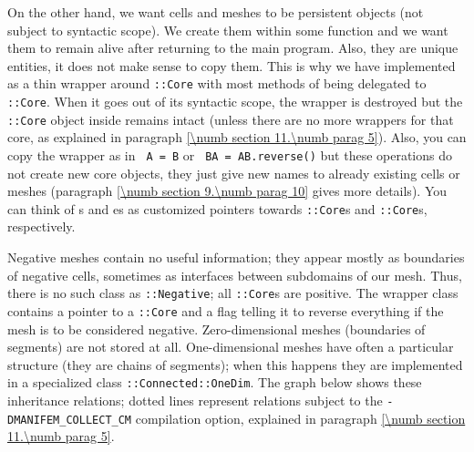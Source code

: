 On the other hand, we want cells and meshes to be persistent objects (not subject to
syntactic scope).
We create them within some function and we want them to remain alive after returning
to the main program.
Also, they are unique entities, it does not make sense to copy them.
This is why we have implemented {\small\tt {}} as a thin wrapper around
{\small\tt {}::Core}
with most methods of {\small\tt {}} being delegated to {\small\tt {}::Core}.
When it goes out of its syntactic scope, the wrapper is destroyed but the {\small\tt {}::Core}
object inside remains intact (unless there are no more wrappers for that core, as explained in
paragraph \ref{\numb section 11.\numb parag 5}).
Also, you can copy the wrapper as in {\small\tt {} A = B} or {\small\tt {} BA = AB.reverse()}
but these operations do not create new core objects, they just give new names to
already existing cells or meshes (paragraph \ref{\numb section 9.\numb parag 10} gives
more details).
You can think of {\small\tt {}}s and {\small\tt {}}es as customized pointers towards
{\small\tt {}::Core}s and {\small\tt {}::Core}s, respectively.

Negative meshes contain no useful information; they appear mostly as boundaries
of negative cells, sometimes as interfaces between subdomains of our mesh.
Thus, there is no such class as {\small\tt {}::Negative};
all {\small\tt {}::Core}s are positive.
The wrapper class {\small\tt {}} contains a pointer to a {\small\tt {}::Core}
and a flag telling it to reverse everything if the mesh is to be considered negative.
Zero-dimensional meshes (boundaries of segments) are not stored at all.
One-dimensional meshes have often a particular structure (they are chains of segments);
when this happens they are implemented in a specialized class {\small\tt {}::Connected::OneDim}.
The graph below shows these inheritance relations; dotted lines represent relations subject to
the {\small\tt -DMANIFEM\_COLLECT\_CM} compilation option, explained in paragraph
\ref{\numb section 11.\numb parag 5}.

